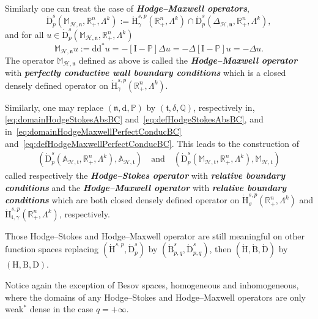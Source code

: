 \documentclass[AHL,Unicode,longabstracts,published]{cedram}
\newcommand{\bbP}{\mathbb{P}}
\newcommand{\bbA}{\mathbb{A}}
\newcommand{\bbR}{\mathbb{R}}
\newcommand{\bbM}{\mathbb{M}}
\newcommand{\bbQ}{\mathbb{Q}}
\newcommand{\rmH}{\mathrm{H}}%
\newcommand{\rmB}{\mathrm{B}}
\newcommand{\rmd}{\mathrm{d}}
\newcommand{\rmD}{\mathrm{D}}
\newcommand{\rmI}{\mathrm{I}}
\newcommand{\clH}{\mathcal{H}}
\newcommand{\fkn}{\mathfrak{n}}
\newcommand{\fkt}{\mathfrak{t}}
\begin{document}
Similarly one can treat the case of \textbf{\emph{Hodge--Maxwell operators}},
\begin{equation}\label{eq:domainHodgeMaxwellPerfectConducBC}
\dot{\rmD}^{s}_{p}\left(\bbM_{\clH,\fkn},\bbR^n_+,\Lambda^k\right):= \dot{\rmH}^{s,p}_{\gamma}\left(\bbR^n_+,\Lambda^k\right)\cap\dot{\rmD}^{s}_{p}\left(\Delta_{\clH,\fkn},\bbR^n_+,\Lambda^k\right),
\end{equation}
and for all $u\in \dot{\rmD}^{s}_{p}(\bbM_{\clH,\fkn},\bbR^n_+,\Lambda^k)$
\begin{equation}\label{eq:defHodgeMaxwellPerfectConducBC}
\bbM_{\clH,\fkn} u:= \rmd\rmd^\ast u = -[\rmI -\bbP]\Delta u = -\Delta [\rmI -\bbP] u =-\Delta u .
\end{equation}
The operator $\bbM_{\clH,\fkn}$ defined as above is called the \textbf{\emph{Hodge--Maxwell operator}} with \textbf{\emph{perfectly conductive wall boundary conditions}} which is a closed densely defined operator on $\dot{\rmH}^{s,p}_{\gamma}(\bbR^n_+,\Lambda^k)$.

Similarly, one may replace $(\fkn,\rmd,\bbP)$ by $(\fkt,\delta,\bbQ)$, respectively in, \eqref{eq:domainHodgeStokesAbsBC} and~\eqref{eq:defHodgeStokesAbsBC}, and in~\eqref{eq:domainHodgeMaxwellPerfectConducBC} and~\eqref{eq:defHodgeMaxwellPerfectConducBC}. This leads to the construction of
\begin{align}
\left(\dot{\rmD}^{s}_{p}\left(\bbA_{\clH,\fkt},\bbR^n_+,\Lambda^k\right), \bbA_{\clH,\fkt}\right)\quad \text{and}\quad\left(\dot{\rmD}^{s}_{p}\left(\bbM_{\clH,\fkt},\bbR^n_+,\Lambda^k\right), \bbM_{\clH,\fkt}\right)
\end{align}
called respectively the \textbf{\emph{Hodge--Stokes operator}} with \textbf{\emph{relative boundary conditions}} and the \textbf{\emph{Hodge--Maxwell operator}} with \textbf{\emph{relative boundary conditions}} which are both closed densely defined operator on $\dot{\rmH}^{s,p}_{\sigma}(\bbR^n_+,\Lambda^k)$ and $\dot{\rmH}^{s,p}_{\fkt,\gamma}(\bbR^n_+,\Lambda^k)$, respectively.

Those Hodge--Stokes and Hodge--Maxwell operator are still meaningful on other function spaces replacing $(\dot{\rmH}^{s,p},\dot{\rmD}^{s}_{p})$ by $(\dot{\rmB}^{s}_{p,q},\dot{\rmD}^{s}_{p,q})$, then $(\dot{\rmH},\dot{\rmB},\dot{\rmD})$ by $({\rmH},{\rmB},{\rmD})$.

Notice again the exception of Besov spaces, homogeneous and inhomogeneous, where the domains of any Hodge--Stokes and Hodge--Maxwell operators are only weak${}^\ast$ dense in the case $q=+\infty$.
\end{document}
